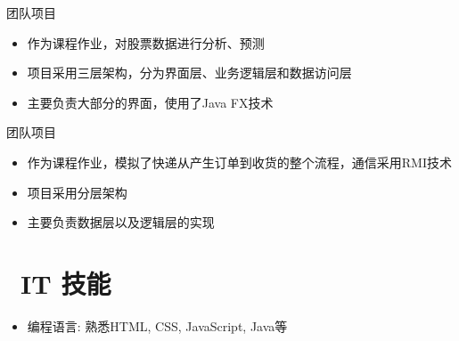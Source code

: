 \documentclass{resume}
\begin{document}
  {团队项目}
\begin{onehalfspacing}
\begin{itemize}
  \item 作为课程作业，对股票数据进行分析、预测
  \item 项目采用三层架构，分为界面层、业务逻辑层和数据访问层
  \item 主要负责大部分的界面，使用了Java FX技术
\end{itemize}
\end{onehalfspacing}

  {团队项目}
\begin{onehalfspacing}
\begin{itemize}
  \item 作为课程作业，模拟了快递从产生订单到收货的整个流程，通信采用RMI技术
  \item 项目采用分层架构
  \item 主要负责数据层以及逻辑层的实现
\end{itemize}
\end{onehalfspacing}



\section{\faCogs\ IT 技能}
\begin{itemize}[parsep=0.5ex]
  \item 编程语言: 熟悉HTML, CSS, JavaScript, Java等
\end{itemize}

%
%
\end{document}
